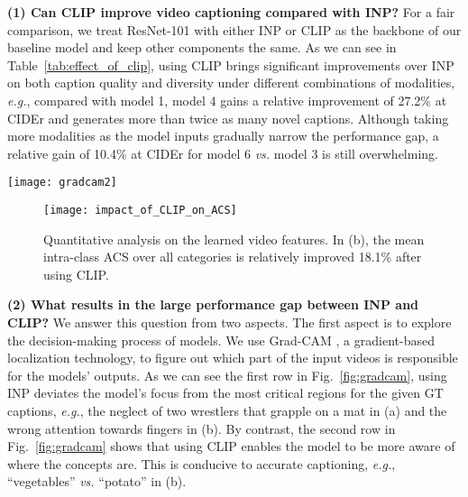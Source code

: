 \documentclass[runningheads]{llncs}
\newcommand\vs{\textit{vs.}}
\newcommand\eg{\textit{e.g.}}
\begin{document}
\textbf{(1) Can CLIP improve video captioning compared with INP?} For a fair comparison, we treat ResNet-101 with either INP or CLIP as the backbone of our baseline model and keep other components the same. As we can see in Table~\ref{tab:effect_of_clip}, using CLIP brings significant improvements over INP on both caption quality and diversity under different combinations of modalities, \eg{}, compared with model 1, model 4 gains a relative improvement of 27.2\% at CIDEr and generates more than twice as many novel captions. Although taking more modalities as the model inputs gradually narrow the performance gap, a relative gain of 10.4\% at CIDEr for model 6 \vs{} model 3 is still overwhelming.



\begin{figure*}[t]
\centering
\texttt{[image: gradcam2]}
\caption{Grad-CAM for the given ground-truth (GT) captions. In each case, the input of the video caption model is two manually selected keyframes, based on which the actual generated description is given above the subfigure.}
\label{fig:gradcam}
\end{figure*}

\begin{figure}[t]
    \centering  
    \texttt{[image: impact\_of\_CLIP\_on\_ACS]}
    \caption{Quantitative analysis on the learned video features. In (b), the mean intra-class ACS over all categories is relatively improved 18.1\% after using CLIP.}
    \label{fig:impact_of_CLIP_on_ACS}
\end{figure}



\textbf{(2) What results in the large performance gap between INP and CLIP?} We answer this question from two aspects. The first aspect is to explore the decision-making process of models. We use Grad-CAM \cite{selvaraju2017grad}, a gradient-based localization technology, to figure out which part of the input videos is responsible for the models' outputs. As we can see the first row in Fig.~\ref{fig:gradcam}, using INP deviates the model's focus from the most critical regions for the given GT captions, \eg{}, the neglect of two wrestlers that grapple on a mat in (a) and the wrong attention towards fingers in (b). By contrast, the second row in Fig.~\ref{fig:gradcam} shows that using CLIP enables the model to be more aware of where the concepts are. This is conducive to accurate captioning, \eg{}, ``vegetables'' \vs{} ``potato'' in (b).
\end{document}
